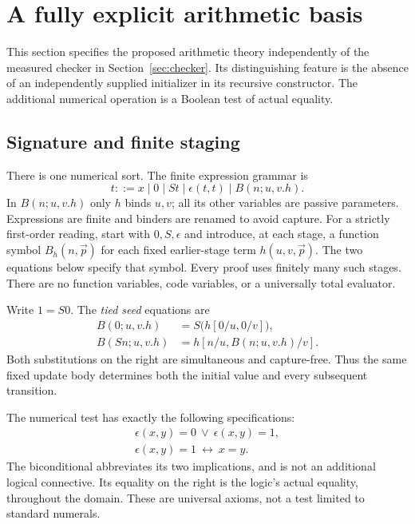 \section{A fully explicit arithmetic basis}
\label{sec:new-basis}

This section specifies the proposed arithmetic theory independently of the measured checker in Section~\ref{sec:checker}. Its distinguishing feature is the absence of an independently supplied initializer in its recursive constructor. The additional numerical operation is a Boolean test of actual equality.

\subsection{Signature and finite staging}
There is one numerical sort. The finite expression grammar is
\[
 t::=x\mid0\mid St\mid \epsilon(t,t)\mid B(n;u,v.h).
\]
In $B(n;u,v.h)$ only $h$ binds $u,v$; all its other variables are passive parameters. Expressions are finite and binders are renamed to avoid capture. For a strictly first-order reading, start with $0,S,\epsilon$ and introduce, at each stage, a function symbol $B_h(n,\vec p)$ for each fixed earlier-stage term $h(u,v,\vec p)$. The two equations below specify that symbol. Every proof uses finitely many such stages. There are no function variables, code variables, or a universally total evaluator.

Write $1=S0$. The \emph{tied seed} equations are
\begin{align}
 B(0;u,v.h)&=S\bigl(h[0/u,0/v]\bigr),\tag{B0}\label{basis:b0}\\
 B(Sn;u,v.h)&=h[n/u,B(n;u,v.h)/v].\tag{BS}\label{basis:bs}
\end{align}
Both substitutions on the right are simultaneous and capture-free. Thus the same fixed update body determines both the initial value and every subsequent transition.

The numerical test has exactly the following specifications:
\begin{align}
 \epsilon(x,y)=0\ \lor\ \epsilon(x,y)=1,\tag{E-range}\label{basis:erange}\\
 \epsilon(x,y)=1\ \longleftrightarrow\ x=y.\tag{E-reflection}\label{basis:ereflect}
\end{align}
The biconditional abbreviates its two implications, and is not an additional logical connective. Its equality on the right is the logic's actual equality, throughout the domain. These are universal axioms, not a test limited to standard numerals.

